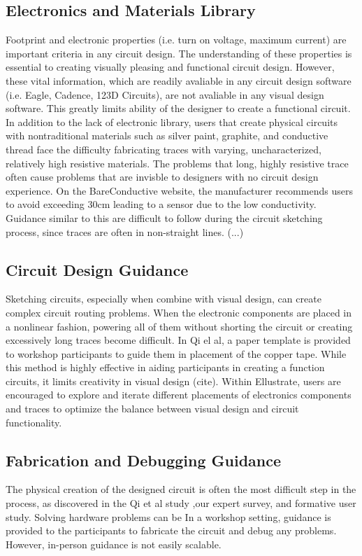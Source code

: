 \documentclass{sigchi}
\begin{document}
\subsection{Electronics and Materials Library}
Footprint and electronic properties (i.e. turn on voltage, maximum current) are important criteria in any circuit design. The understanding of these properties is essential to creating visually pleasing and functional circuit design. However, these vital information, which are readily avaliable in any circuit design software (i.e. Eagle, Cadence, 123D Circuits), are not avaliable in any visual design software. This greatly limits ability of the designer to create a functional circuit. In addition to the lack of electronic library, users that create physical circuits with nontraditional materials such as silver paint, graphite, and conductive thread face the difficulty fabricating traces with varying, uncharacterized, relatively high resistive materials. The problems that long, highly resistive trace often cause problems that are invisble to designers with no circuit design experience. On the BareConductive website, the manufacturer recommends users to avoid exceeding 30cm leading to a sensor due to the low conductivity. Guidance similar to this are difficult to follow during the circuit sketching process, since traces are often in non-straight lines. (...)

\subsection{Circuit Design Guidance}
Sketching circuits, especially when combine with visual design, can create complex circuit routing problems. When the electronic components are placed in a nonlinear fashion, powering all of them without shorting the circuit or creating excessively long traces become difficult. In Qi el al, a paper template is provided to workshop participants to guide them in placement of the copper tape. While this method is highly effective in aiding participants in creating a function circuits, it limits creativity in visual design (cite).  Within Ellustrate, users are encouraged to explore and iterate different placements of electronics components and traces to optimize the balance between visual design and circuit functionality.
\subsection{Fabrication and Debugging Guidance}
The physical creation of the designed circuit is often the most difficult step in the process, as discovered in the Qi et al study ,our expert survey, and formative user study. Solving hardware problems can be In a workshop setting, guidance is provided to the participants to fabricate the circuit and debug any problems. However, in-person guidance is not easily scalable.
\end{document}
